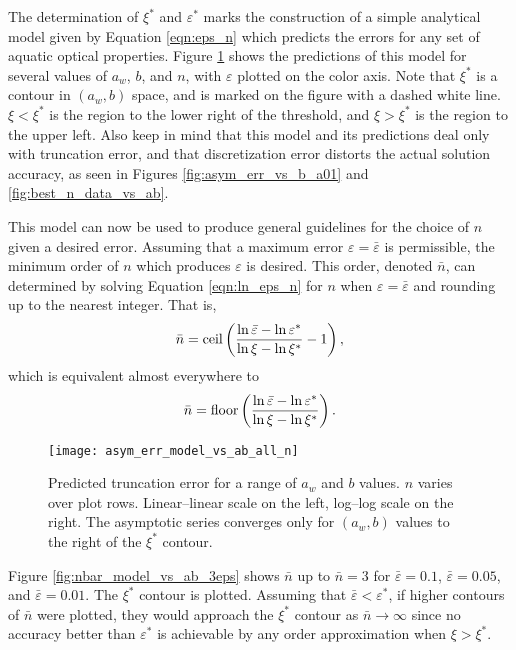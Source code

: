The determination of $\xi^*$ and $\varepsilon^*$ marks the construction of a simple analytical model given by Equation \eqref{eqn:eps_n} which predicts the errors for any set of aquatic optical properties.
Figure \ref{fig:asym_err_model_vs_ab_all_n} shows the predictions of this model for several values of $a_w$, $b$, and $n$, with $\varepsilon$ plotted on the color axis.
Note that $\xi^*$ is a contour in $(a_w, b)$ space, and is marked on the figure with a dashed white line.
$\xi<\xi^*$ is the region to the lower right of the threshold, and $\xi>\xi^*$ is the region to the upper left.
Also keep in mind that this model and its predictions deal only with truncation error, and that discretization error distorts the actual solution accuracy, as seen in Figures \ref{fig:asym_err_vs_b_a01} and \ref{fig:best_n_data_vs_ab}.


This model can now be used to produce general guidelines for the choice of $n$ given a desired error.
Assuming that a maximum error $\varepsilon=\bar\varepsilon$ is permissible, the minimum order of $n$ which produces $\varepsilon$ is desired.
This order, denoted $\bar{n}$, can determined by solving Equation \eqref{eqn:ln_eps_n} for $n$ when $\varepsilon=\bar{\varepsilon}$ and rounding up to the nearest integer.
That is,
\begin{equation*}
  \bar{n} = \mbox{ceil}\left(\frac{\ln\bar{\varepsilon} - \ln\varepsilon^*}{\ln\xi - \ln\xi^*} - 1 \right),
\end{equation*}
which is equivalent almost everywhere to
\begin{equation}
  \label{eqn:n_bar}
  \bar{n} = \mbox{floor}\left(\frac{\ln\bar{\varepsilon} - \ln\varepsilon^*}{\ln\xi - \ln\xi^*}\right).
\end{equation}

\begin{figure}[H]
  \centering
  \texttt{[image: asym\_err\_model\_vs\_ab\_all\_n]}
  \caption{Predicted truncation error for a range of $a_w$ and $b$ values. $n$ varies over plot rows. Linear--linear scale on the left, log--log scale on the right. The asymptotic series converges only for $(a_w,b)$ values to the right of the $\xi^*$ contour.}
  \label{fig:asym_err_model_vs_ab_all_n}
\end{figure}


Figure \ref{fig:nbar_model_vs_ab_3eps} shows $\bar{n}$ up to $\bar{n}=3$ for $\bar{\varepsilon}=0.1$, $\bar{\varepsilon}=0.05$, and $\bar{\varepsilon}=0.01$.
The $\xi^*$ contour is plotted.
Assuming that $\bar{\varepsilon}<\varepsilon^*$, if higher contours of $\bar{n}$ were plotted, they would approach the $\xi^*$ contour as $\bar{n} \to \infty$ since no accuracy better than $\varepsilon^*$ is achievable by any order approximation when $\xi > \xi^*$.

